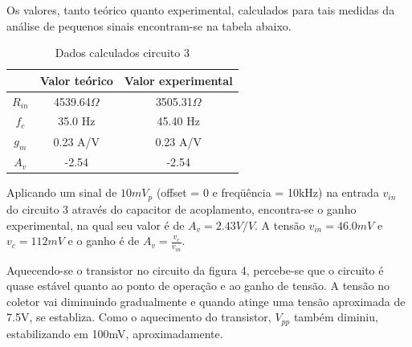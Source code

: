 \documentclass[a4paper]{article} %
\begin{document}
%
Os valores, tanto teórico quanto experimental, calculados para tais medidas da análise
de pequenos sinais encontram-se na tabela abaixo.
\begin{table}[h!]
\begin{centering}
\begin{tabular}{ccc}
\hline 
 & Valor teórico & Valor experimental\tabularnewline
\hline
\hline 
$R_{in}$ & 4539.64$\Omega$ & 3505.31$\Omega$\tabularnewline
$f_{c}$ & 35.0 Hz & 45.40 Hz\tabularnewline
$g_{m}$ & 0.23 A/V & 0.23 A/V\tabularnewline
$A_{v}$ & -2.54 & -2.54\tabularnewline
\hline
\end{tabular}
\par\end{centering}

\caption{Dados calculados circuito 3}

\end{table}



Aplicando um sinal de $10mV_p$ (offset = 0 e freqüência = 10kHz) na entrada $v_{in}$
do circuito 3 através do capacitor de acoplamento, encontra-se o ganho experimental, na qual seu
valor é de $A_v=2.43V/V$. A tensão  $v_{in}=46.0mV$ e  $v_c=112mV$ e o ganho é de $A_v=\frac{v_c}{v_{in}}$.

Aquecendo-se o transistor no circuito da figura 4, percebe-se que o circuito é quase
estável quanto ao ponto de operação e ao ganho de tensão. A tensão no coletor vai
diminuindo gradualmente e quando atinge uma tensão aproximada de 7.5V,
se establiza.
Como o aquecimento do transistor, $V_{pp}$ também diminiu, estabilizando em 100mV,
aproximadamente.











\end{document}
